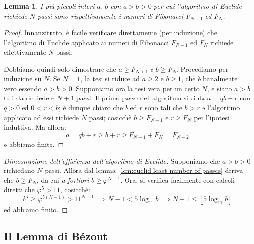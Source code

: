 \documentclass[pdflatex,11pt,a4paper,oneside]{article}
\let\gold=\varphi
\newcommand{\floor}[1]{\left\lfloor{#1}\right\rfloor}
\newtheorem{lemma}[TheoremLike]{Lemma}
\begin{document}
\begin{lemma}\label{lem:euclid-least-number-of-passes}
I pi\`u piccoli interi $a$, $b$ con $a > b > 0$ per cui l'algoritmo di
Euclide richiede $N$ passi sono rispettivamente i numeri di Fibonacci
$F_{N+1}$ ed $F_{N}$.
\end{lemma}
%
\begin{proof}
Innanzitutto, \`e facile verificare direttamente (per induzione) che
l'algoritmo di Euclide applicato ai numeri di Fibonacci $F_{N+1}$ ed
$F_{N}$ richiede effettivamente $N$ passi.

Dobbiamo quindi solo dimostrare che $a \geq F_{N+1}$ e $b \geq F_N$.
Procediamo per induzione su $N$. Se $N = 1$, la tesi si riduce ad
$a \geq 2$ e $b \geq 1$, che \`e banalmente vero essendo $a > b > 0$.
Supponiamo ora la tesi vera per un certo $N$, e siano $a > b$ tali da
richiedere $N + 1$ passi. Il primo passo dell'algoritmo si ci d\`a
$a = qb + r$ con $q > 0$ ed $0 < r < b$; \`e dunque chiaro che $b$ ed
$r$ sono tali che $b > r$ e l'algoritmo applicato ad essi richiede
$N$ passi; cosicch\`e $b \geq F_{N+1}$ e $r \geq F_N$ per l'ipotesi
induttiva. Ma allora:
 $$ a = qb + r \geq b + r \geq F_{N+1} + F_N = F_{N+2}$$
e abbiamo finito.
\end{proof}

\begin{proof}[Dimostrazione dell'efficienza dell'algoritmo di Euclide]
Supponiamo che $a > b > 0$ richiedano $N$ passi.  Allora dal
lemma~\eqref{lem:euclid-least-number-of-passes} deriva che $b \geq F_N$,
da cui \emph{a fortiori} $b \geq \gold^{N-1}$.  Ora, si verifica
facilmente con calcoli diretti che $\gold^5 > 11$, cosicch\`e:
\begin{displaymath}
 b^5 \geq \gold^{5(N-1)} > 11^{N-1}
   \implies N - 1 < 5 \log_{11} b
   \implies N - 1 \leq \floor{5 \log_{11} b}
\end{displaymath}
ed abbiamo finito.
\end{proof}


\subsection{Il Lemma di B\'ezout}
\end{document}
